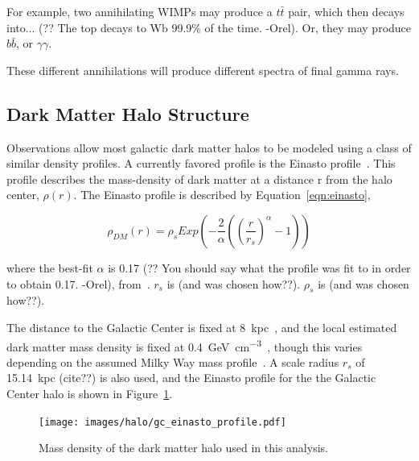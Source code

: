     For example, two annihilating WIMPs may produce a $t\bar{t}$ pair, which then decays into... {\color{red}(?? The top decays to Wb 99.9\% of the time. -Orel)}.
    Or, they may produce $b\bar{b}$, or $\gamma\gamma$.

    These different annihilations will produce different spectra of final gamma rays.
  
  \subsection{Dark Matter Halo Structure}\label{dm_spatial}
    Observations allow most galactic dark matter halos to be modeled using a class of similar density profiles.
    A currently favored profile is the Einasto profile~\cite{einastoprofile1,einastoprofile2}.
    This profile describes the mass-density of dark matter at a distance r from the halo center, $\rho(r)$.
    The Einasto profile is described by Equation~\ref{eqn:einasto},

    \begin{equation} \label{eqn:einasto}
      \rho_{DM} \left( r \right) = \rho_{s} Exp \left( - \frac{2}{\alpha} \left( {\left( \frac{r}{r_s} \right)}^{\alpha} - 1 \right) \right)
    \end{equation}
    
    where the best-fit $\alpha$ is {\color{red}0.17 (?? You should say what the profile was fit to in order to obtain 0.17. -Orel)}, from~\cite{PieriGalaxySims}.
    $r_s$ is {\color{red}(and was chosen how??)}.
    $\rho_s$ is {\color{red}(and was chosen how??)}.

    The distance to the Galactic Center is fixed at \SI{8}{kpc}~\cite{gc_distance_1,gc_distance_2,gc_distance_3}, and the local estimated dark matter mass density is fixed at \SI{0.4}{\GeV\per\cm^3}~\cite{local_dm_density}, though this varies depending on the assumed Milky Way mass profile~\cite{direct_dm_astrophysical_uncertainties}.
    A scale radius $r_s$ of \SI{15.14}{kpc} {\color{red}(cite??)} is also used, and the Einasto profile for the the Galactic Center halo is shown in Figure~\ref{fig:gchalo_density}.
  
    \begin{figure}[ht]
      \centering
      \texttt{[image: images/halo/gc\_einasto\_profile.pdf]}
      \caption[Galactic Center Einasto Halo Density]{
        Mass density of the dark matter halo used in this analysis.
        \CaptionBlankLine
        }
      \label{fig:gchalo_density}
    \end{figure}
    
